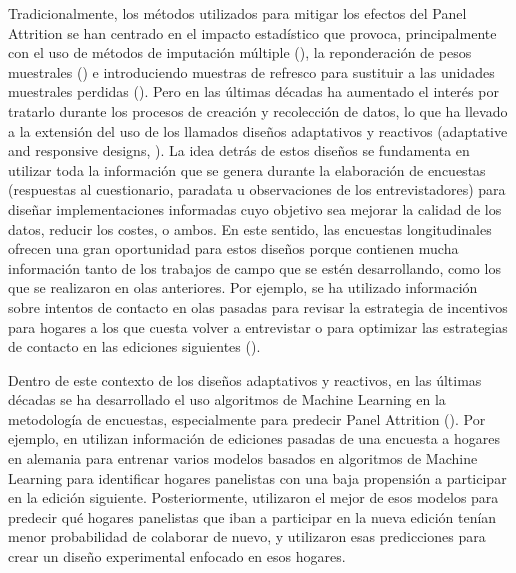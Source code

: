 Tradicionalmente, los métodos utilizados para mitigar los efectos del Panel Attrition se han centrado en el impacto estadístico que provoca, principalmente con el uso de métodos de imputación múltiple (\cite{rubin1987multiple}), la reponderación de pesos muestrales (\cite{groves2009survey}) e introduciendo muestras de refresco para sustituir a las unidades muestrales perdidas (\cite{hirano1998combining}). Pero en las últimas décadas ha aumentado el interés por tratarlo durante los procesos de creación y recolección de datos, lo que ha llevado a la extensión del uso de los llamados diseños adaptativos y reactivos (adaptative and responsive designs, \cite{tourangeau2017adaptive}). La idea detrás de estos diseños se fundamenta en utilizar toda la información que se genera durante la elaboración de encuestas (respuestas al cuestionario, paradata u observaciones de los entrevistadores) para diseñar implementaciones informadas cuyo objetivo sea mejorar la calidad de los datos, reducir los costes, o ambos. En este sentido, las encuestas longitudinales ofrecen una gran oportunidad para estos diseños porque contienen mucha información tanto de los trabajos de campo que se estén desarrollando, como los que se realizaron en olas anteriores. Por ejemplo, se ha utilizado información sobre intentos de contacto en olas pasadas para revisar la estrategia de incentivos para hogares a los que cuesta volver a entrevistar \cite{mcgonagle2022effects} o para optimizar las estrategias de contacto en las ediciones siguientes (\cite{kreuter2015note}).

Dentro de este contexto de los diseños adaptativos y reactivos, en las últimas décadas se ha desarrollado el uso algoritmos de Machine Learning en la metodología de encuestas, especialmente para predecir Panel Attrition (\cite{buskirk2018introduction}). Por ejemplo, en \cite{beste2023case} utilizan información de ediciones pasadas de una encuesta a hogares en alemania para entrenar varios modelos basados en algoritmos de Machine Learning para identificar hogares panelistas con una baja propensión a participar en la edición siguiente. Posteriormente, utilizaron el mejor de esos modelos para predecir qué hogares panelistas que iban a participar en la nueva edición tenían menor probabilidad de colaborar de nuevo, y utilizaron esas predicciones para crear un diseño experimental enfocado en esos hogares.

